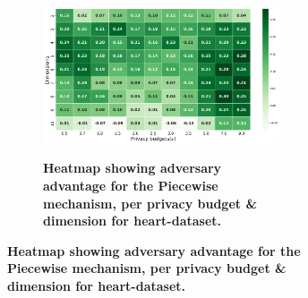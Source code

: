 \begin{figure}[H]
\begin{subfigure}[b]{0.85\textwidth}
    \begin{subfigure}[c]{1\textwidth}
      \caption{\textbf{Heatmap showing adversary advantage for the Piecewise mechanism, per privacy budget \& dimension for heart-dataset.}}
      \includegraphics[width=1\textwidth]{Results/kd-laplace/piecewise/heart-dataset/shokri_mi_adv.png}
      \label{fig:privacy_heart-dataset_adversial_advantage_piecewise}
    \end{subfigure}
  \end{subfigure}
  \hfill %
  \begin{subfigure}[b]{0.075\textwidth}

\end{subfigure}
\end{figure}
